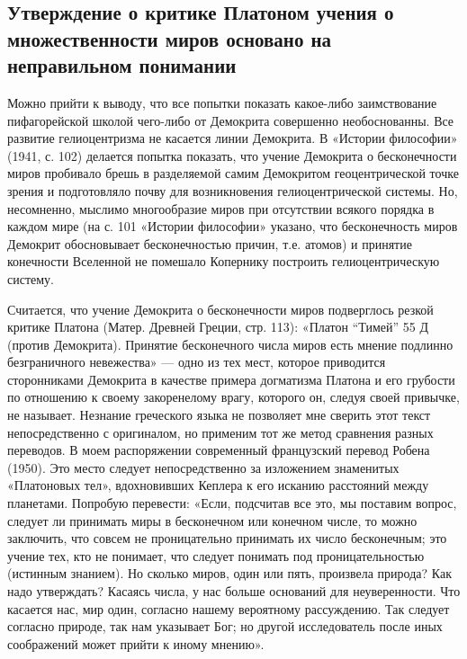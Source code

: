 \subsection{Утверждение  о критике  Платоном учения  о множественности
миров основано на неправильном понимании}

Можно   прийти  к   выводу,  что   все  попытки   показать  какое-либо
заимствование пифагорейской  школой чего-либо от  Демокрита совершенно
необоснованны.   Все  развитие   гелиоцентризма   не  касается   линии
Демокрита.  В  «Истории философии»  (1941,  с.  102) делается  попытка
показать,  что  учение  Демокрита   о  бесконечности  миров  пробивало
брешь  в разделяемой  самим  Демокритом  геоцентрической точке  зрения
и  подготовляло  почву  для возникновения  гелиоцентрической  системы.
Но,  несомненно, мыслимо  многообразие  миров  при отсутствии  всякого
порядка  в  каждом  мире  (на  с.  101  «Истории  философии»  указано,
что бесконечность  миров Демокрит обосновывает  бесконечностью причин,
т.е.  атомов) и  принятие конечности  Вселенной не  помешало Копернику
построить гелиоцентрическую систему.

Считается,  что учение  Демокрита  о  бесконечности миров  подверглось
резкой  критике Платона  (Матер.  Древней Греции,  стр. 113):  «Платон
``Тимей'' 55  Д (против Демокрита). Принятие  бесконечного числа миров
есть  мнение  подлинно  безграничного  невежества»  ---  одно  из  тех
мест,  которое приводится  сторонниками Демокрита  в качестве  примера
догматизма Платона и  его грубости по отношению  к своему закоренелому
врагу,  которого  он, следуя  своей  привычке,  не называет.  Незнание
греческого языка не позволяет мне сверить этот текст непосредственно с
оригиналом, но  применим тот  же метод  сравнения разных  переводов. В
моем распоряжении  современный французский перевод Робена  (1950). Это
место  следует непосредственно  за  изложением знаменитых  «Платоновых
тел», вдохновивших  Кеплера к его исканию  расстояний между планетами.
Попробую  перевести: «Если,  подсчитав  все это,  мы поставим  вопрос,
следует  ли  принимать  миры  в бесконечном  или  конечном  числе,  то
можно  заключить,  что  совсем  не проницательно  принимать  их  число
бесконечным; это учение тех, кто не понимает, что следует понимать под
проницательностью (истинным знанием). Но сколько миров, один или пять,
произвела природа?  Как надо утверждать?  Касаясь числа, у  нас больше
оснований  для неуверенности.  Что  касается нас,  мир один,  согласно
нашему вероятному  рассуждению. Так следует согласно  природе, так нам
указывает Бог;  но другой  исследователь после иных  соображений может
прийти к иному мнению».

